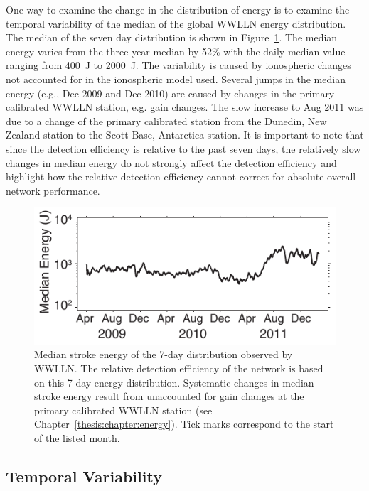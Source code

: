 One way to examine the change in the distribution of energy is to examine the temporal variability of the median of the global WWLLN energy distribution.
The median of the seven day distribution is shown in Figure~\ref{efficiency:fig:MedianEnergy}.
The median energy varies from the three year median by 52\% with the daily median value ranging from 400~J to 2000~J.
The variability is caused by ionospheric changes not accounted for in the ionospheric model used.
Several jumps in the median energy (e.g., Dec 2009 and Dec 2010) are caused by changes in the primary calibrated WWLLN station, e.g. gain changes.
The slow increase to Aug 2011 was due to a change of the primary calibrated station from the Dunedin, New Zealand station to the Scott Base, Antarctica station.
It is important to note that since the detection efficiency is relative to the past seven days, the relatively slow changes in median energy do not strongly affect the detection efficiency and highlight how the relative detection efficiency cannot correct for absolute overall network performance.

\begin{figure}[ht!]
   \centering
\noindent\includegraphics[scale=1]{efficiency/Figures/2012RS005049-f8.pdf}
   \caption{Median stroke energy of the 7-day distribution observed by WWLLN.
The relative detection efficiency of the network is based on this 7-day energy distribution.
   Systematic changes in median stroke energy result from unaccounted for gain changes at the primary calibrated WWLLN station (see Chapter~\ref{thesis:chapter:energy}).
   Tick marks correspond to the start of the listed month.}
   \label{efficiency:fig:MedianEnergy}
\end{figure}

\subsection{Temporal Variability}

